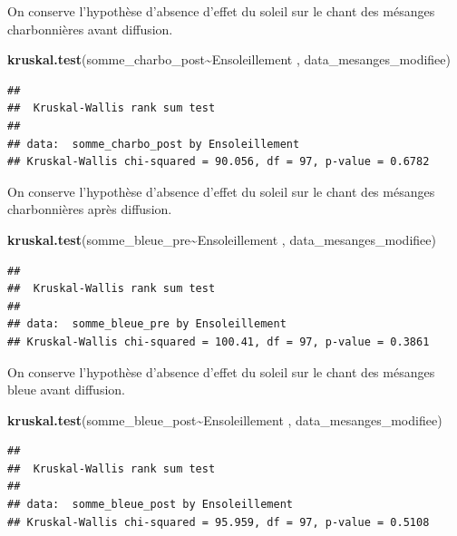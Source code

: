 \documentclass[
  french,
]{article}
\newenvironment{Shaded}{\begin{snugshade}}{\end{snugshade}}
\newcommand{\FunctionTok}[1]{\textcolor[rgb]{0.13,0.29,0.53}{\textbf{#1}}}
\newcommand{\NormalTok}[1]{#1}
\newcommand{\SpecialCharTok}[1]{\textcolor[rgb]{0.81,0.36,0.00}{\textbf{#1}}}
\begin{document}
On conserve l'hypothèse d'absence d'effet du soleil sur le chant des
mésanges charbonnières avant diffusion.

\begin{Shaded}
\begin{Highlighting}[]
\FunctionTok{kruskal.test}\NormalTok{(somme\_charbo\_post}\SpecialCharTok{\textasciitilde{}}\NormalTok{Ensoleillement , data\_mesanges\_modifiee)}
\end{Highlighting}
\end{Shaded}

\begin{verbatim}
## 
##  Kruskal-Wallis rank sum test
## 
## data:  somme_charbo_post by Ensoleillement
## Kruskal-Wallis chi-squared = 90.056, df = 97, p-value = 0.6782
\end{verbatim}

On conserve l'hypothèse d'absence d'effet du soleil sur le chant des
mésanges charbonnières après diffusion.

\begin{Shaded}
\begin{Highlighting}[]
\FunctionTok{kruskal.test}\NormalTok{(somme\_bleue\_pre}\SpecialCharTok{\textasciitilde{}}\NormalTok{Ensoleillement , data\_mesanges\_modifiee)}
\end{Highlighting}
\end{Shaded}

\begin{verbatim}
## 
##  Kruskal-Wallis rank sum test
## 
## data:  somme_bleue_pre by Ensoleillement
## Kruskal-Wallis chi-squared = 100.41, df = 97, p-value = 0.3861
\end{verbatim}

On conserve l'hypothèse d'absence d'effet du soleil sur le chant des
mésanges bleue avant diffusion.

\begin{Shaded}
\begin{Highlighting}[]
\FunctionTok{kruskal.test}\NormalTok{(somme\_bleue\_post}\SpecialCharTok{\textasciitilde{}}\NormalTok{Ensoleillement , data\_mesanges\_modifiee)}
\end{Highlighting}
\end{Shaded}

\begin{verbatim}
## 
##  Kruskal-Wallis rank sum test
## 
## data:  somme_bleue_post by Ensoleillement
## Kruskal-Wallis chi-squared = 95.959, df = 97, p-value = 0.5108
\end{verbatim}
\end{document}
